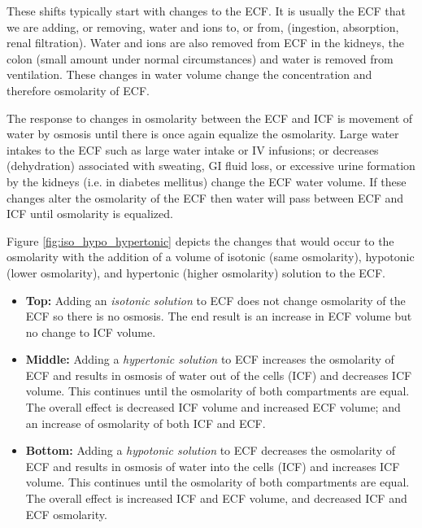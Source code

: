 These shifts typically start with changes to the ECF. It is usually the ECF that we are adding, or removing, water and ions to, or from, (ingestion, absorption, renal filtration). Water and ions are also removed from ECF in the kidneys, the colon (small amount under normal circumstances) and water is removed from ventilation.  These changes in water volume change the concentration and therefore osmolarity of ECF. 


The response to changes in osmolarity between the ECF and ICF is movement of water by osmosis until there is once again equalize the osmolarity. Large water intakes to the ECF such as large water intake or IV infusions; or decreases (dehydration) associated with sweating, GI fluid loss, or excessive urine formation by the kidneys (i.e. in diabetes mellitus) change the ECF water volume. If these changes alter the osmolarity of the ECF then water will pass between ECF and ICF until osmolarity is equalized.

Figure \ref{fig:iso_hypo_hypertonic} depicts the changes that would occur to the osmolarity with the addition of a volume of isotonic (same osmolarity), hypotonic (lower osmolarity), and hypertonic (higher osmolarity) solution to the ECF.
    \begin{itemize}
        \item \textbf{Top:} Adding an \textit{isotonic solution} to ECF does not change osmolarity of the ECF so there is no osmosis. The end result is an increase in ECF volume but no change to ICF volume.
        \item \textbf{Middle:} Adding a \textit{hypertonic solution} to ECF increases the osmolarity of ECF and results in osmosis of water out of the cells (ICF) and decreases ICF volume. This continues until the osmolarity of both compartments are equal. The overall effect is decreased ICF volume and increased ECF volume; and an increase of osmolarity of both ICF and ECF. 
        \item  \textbf{Bottom:} Adding a \textit{hypotonic solution} to ECF decreases the osmolarity of ECF and results in osmosis of water into the cells (ICF) and increases ICF volume. This continues until the osmolarity of both compartments are equal. The overall effect is increased ICF and ECF volume, and decreased ICF and ECF osmolarity. 
    \end{itemize}

